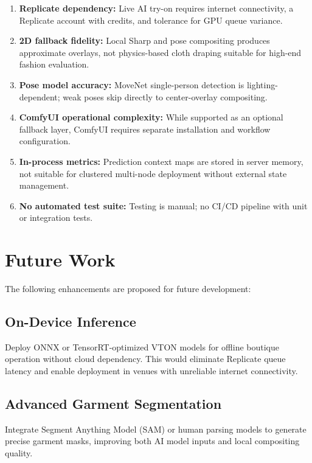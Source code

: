 \begin{enumerate}[leftmargin=*]
  \item \textbf{Replicate dependency:} Live AI try-on requires internet connectivity, a Replicate account with credits, and tolerance for GPU queue variance.
  \item \textbf{2D fallback fidelity:} Local Sharp and pose compositing produces approximate overlays, not physics-based cloth draping suitable for high-end fashion evaluation.
  \item \textbf{Pose model accuracy:} MoveNet single-person detection is lighting-dependent; weak poses skip directly to center-overlay compositing.
  \item \textbf{ComfyUI operational complexity:} While supported as an optional fallback layer, ComfyUI requires separate installation and workflow configuration.
  \item \textbf{In-process metrics:} Prediction context maps are stored in server memory, not suitable for clustered multi-node deployment without external state management.
  \item \textbf{No automated test suite:} Testing is manual; no CI/CD pipeline with unit or integration tests.
\end{enumerate}

\section{Future Work}
\label{sec:future-work}

The following enhancements are proposed for future development:

\subsection{On-Device Inference}

Deploy ONNX or TensorRT-optimized VTON models for offline boutique operation without cloud dependency. This would eliminate Replicate queue latency and enable deployment in venues with unreliable internet connectivity.

\subsection{Advanced Garment Segmentation}

Integrate Segment Anything Model (SAM) or human parsing models to generate precise garment masks, improving both AI model inputs and local compositing quality.

